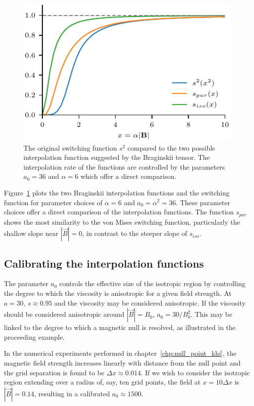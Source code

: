 \begin{figure}[t]
  \centering
  \includegraphics[width=0.5\linewidth]{alt_switching.pdf}
  \caption{The original switching function $s^2$ compared to the two possible interpolation function suggested by the Braginskii tensor. The interpolation rate of the functions are controlled by the parameters $a_0 = 36$ and $\alpha = 6$ which offer a direct comparison.}%
  \label{fig:alt_switching}
\end{figure}

Figure~\ref{fig:alt_switching} plots the two Braginskii interpolation functions and the switching function for parameter choices of $\alpha = 6$ and $a_0 = \alpha^2 = 36$. These parameter choices offer a direct comparison of the interpolation functions. The function $s_{par}$ shows the most similarity to the von Mises switching function, particularly the shallow slope near $|\vec{B}| = 0$, in contrast to the steeper slope of $s_{iso}$. 


\subsection{Calibrating the interpolation functions}

The parameter $a_0$ controls the effective size of the isotropic region by controlling the degree to which the viscosity is anisotropic for a given field strength. At $a = 30$, $s \approx 0.95$ and the viscosity may be considered anisotropic. If the viscosity should be considered anisotropic around $|\vec{B}| = B_0$, $a_0 = 30/B_0^2$. This may be linked to the degree to which a magnetic null is resolved, as illustrated in the proceeding example. 

In the numerical experiments performed in chapter~\ref{chp:null_point_khi}, the magnetic field strength increases linearly with distance from the null point and the grid separation is found to be $\Delta x \approx 0.014$. If we wish to consider the isotropic region extending over a radius of, say, ten grid points, the field at $x = 10 \Delta x$ is $|\vec{B}| = 0.14$, resulting in a calibrated $a_0 \approx 1500$. 

